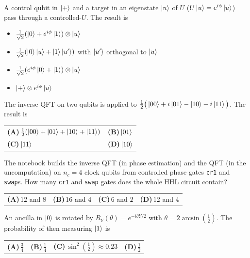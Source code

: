 \documentclass[11pt,a4paper]{article}
\newcommand{\optlabel}[1]{\textbf{(#1)}}
\newenvironment{qitem}[1]{\begin{list}{}{\setlength{\leftmargin}{3.3em}\setlength{\labelwidth}{3.1em}%
  \setlength{\labelsep}{0.2em}\setlength{\topsep}{3pt}\setlength{\parsep}{3pt}}\item[\textbf{Q.#1}\hfill]}{\end{list}}
\newcommand{\qsep}{\par\vspace{2pt}{\color{black!15}\hrule}\vspace{4pt}}
\begin{document}
\begin{qitem}{24}
A control qubit in $\ket+$ and a target in an eigenstate $\ket u$ of $U$ ($U\ket u = e^{i\phi}\ket u$) pass through a controlled-$U$. The result is
\begin{itemize}[leftmargin=2.6em, labelsep=0.4em, itemsep=2pt, topsep=3pt]
\item[\optlabel{A}] $\tfrac{1}{\sqrt2}(\ket0 + e^{i\phi}\ket1)\otimes\ket u$
\item[\optlabel{B}] $\tfrac{1}{\sqrt2}(\ket0\ket u + \ket1\ket{u'})$ with $\ket{u'}$ orthogonal to $\ket u$
\item[\optlabel{C}] $\tfrac{1}{\sqrt2}(e^{i\phi}\ket0 + \ket1)\otimes\ket u$
\item[\optlabel{D}] $\ket+\otimes e^{i\phi}\ket u$
\end{itemize}
\end{qitem}
\qsep

\begin{qitem}{25}
The inverse QFT on two qubits is applied to $\tfrac12\big(\ket{00} + i\ket{01} - \ket{10} - i\ket{11}\big)$. The result is
\par\smallskip\noindent\begin{tabularx}{\linewidth}{@{}*{2}{L}@{}}
\optlabel{A}\,$\tfrac12(\ket{00} + \ket{01} + \ket{10} + \ket{11})$ & \optlabel{B}\,$\ket{01}$ \\[3pt]
\optlabel{C}\,$\ket{11}$ & \optlabel{D}\,$\ket{10}$
\end{tabularx}
\end{qitem}
\qsep

\begin{qitem}{26}
The notebook builds the inverse QFT (in phase estimation) and the QFT (in the uncomputation) on $n_c = 4$ clock qubits from controlled phase gates
\texttt{cr1} and \texttt{swap}s. How many \texttt{cr1} and \texttt{swap} gates does the whole HHL circuit contain?
\par\smallskip\noindent\begin{tabularx}{\linewidth}{@{}*{4}{L}@{}}
\optlabel{A}\,$12$ and $8$ & \optlabel{B}\,$16$ and $4$ & \optlabel{C}\,$6$ and $2$ & \optlabel{D}\,$12$ and $4$
\end{tabularx}
\end{qitem}
\qsep

\begin{qitem}{27}
An ancilla in $\ket0$ is rotated by $R_Y(\theta) = e^{-i\theta Y/2}$ with $\theta = 2\arcsin(\tfrac12)$. The probability of then measuring $\ket1$ is
\par\smallskip\noindent\begin{tabularx}{\linewidth}{@{}*{4}{L}@{}}
\optlabel{A}\,$\tfrac34$ & \optlabel{B}\,$\tfrac14$ & \optlabel{C}\,$\sin^2(\tfrac12) \approx 0.23$ & \optlabel{D}\,$\tfrac12$
\end{tabularx}
\end{qitem}
\qsep
\end{document}
